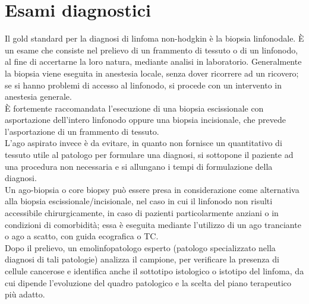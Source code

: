 \section{Esami diagnostici}
Il gold standard per la diagnosi di linfoma non-hodgkin è la biopsia linfonodale. 
È un esame che consiste nel prelievo di un frammento di tessuto o di un linfonodo, al fine di 
accertarne la loro natura, mediante analisi in laboratorio. 
Generalmente la biopsia viene eseguita in anestesia locale, senza dover ricorrere ad un ricovero; 
se si hanno problemi di accesso al linfonodo, si procede con un intervento in anestesia generale\cite{ISS}.\\
È fortemente raccomandata l’esecuzione di una biopsia escissionale con asportazione dell’intero linfonodo 
oppure una biopsia incisionale, che prevede l’asportazione di un frammento di tessuto\cite{AMERICANCANCER}.\\ 
L’ago aspirato invece è da evitare, in quanto non fornisce un quantitativo di tessuto utile al patologo per formulare 
una diagnosi, si sottopone il paziente ad una procedura non necessaria e si allungano i tempi di formulazione 
della diagnosi\cite{reteveneta}.\\
Un ago-biopsia o core biopsy può essere presa in considerazione come alternativa alla biopsia escissionale/incisionale,
nel caso in cui il linfonodo non risulti accessibile chirurgicamente, in caso di pazienti particolarmente anziani o in 
condizioni di comorbidità; essa è eseguita mediante l’utilizzo di un ago tranciante o ago a scatto, con guida 
ecografica o TC\cite{reteveneta}.\\
Dopo il prelievo, un emolinfopatologo esperto (patologo specializzato nella diagnosi di tali patologie) analizza 
il campione, per verificare la presenza di cellule cancerose e identifica anche il sottotipo 
istologico o istotipo del linfoma, da cui dipende l’evoluzione del quadro patologico e la scelta del piano 
terapeutico più adatto\cite{LLS}.\\

